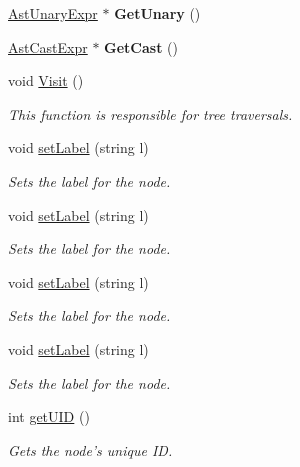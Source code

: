\begin{DoxyCompactItemize}
\item 
\hypertarget{classAstCastExpr_a85178306df5d2e1af2dca5a62ee2fab0}{\hyperlink{classAstUnaryExpr}{Ast\-Unary\-Expr} $\ast$ {\bfseries Get\-Unary} ()}\label{classAstCastExpr_a85178306df5d2e1af2dca5a62ee2fab0}

\item 
\hypertarget{classAstCastExpr_a8f5626c4848927c8695c6f6893a3393b}{\hyperlink{classAstCastExpr}{Ast\-Cast\-Expr} $\ast$ {\bfseries Get\-Cast} ()}\label{classAstCastExpr_a8f5626c4848927c8695c6f6893a3393b}

\item 
void \hyperlink{classAstCastExpr_a5c0f13da0e4bd315eb0e56c9cc9635e9}{Visit} ()
\begin{DoxyCompactList}\small\item\em This function is responsible for tree traversals. \end{DoxyCompactList}\item 
void \hyperlink{classAST_a71d680856e95ff89f55d5311a552eba6}{set\-Label} (string l)
\begin{DoxyCompactList}\small\item\em Sets the label for the node. \end{DoxyCompactList}\item 
void \hyperlink{classAST_a71d680856e95ff89f55d5311a552eba6}{set\-Label} (string l)
\begin{DoxyCompactList}\small\item\em Sets the label for the node. \end{DoxyCompactList}\item 
void \hyperlink{classAST_a71d680856e95ff89f55d5311a552eba6}{set\-Label} (string l)
\begin{DoxyCompactList}\small\item\em Sets the label for the node. \end{DoxyCompactList}\item 
void \hyperlink{classAST_a71d680856e95ff89f55d5311a552eba6}{set\-Label} (string l)
\begin{DoxyCompactList}\small\item\em Sets the label for the node. \end{DoxyCompactList}\item 
int \hyperlink{classAST_ab7a5b1d9f1c2de0d98deb356f724a42c}{get\-U\-I\-D} ()
\begin{DoxyCompactList}\small\item\em Gets the node's unique I\-D. \end{DoxyCompactList}\item 

\end{DoxyCompactItemize}
